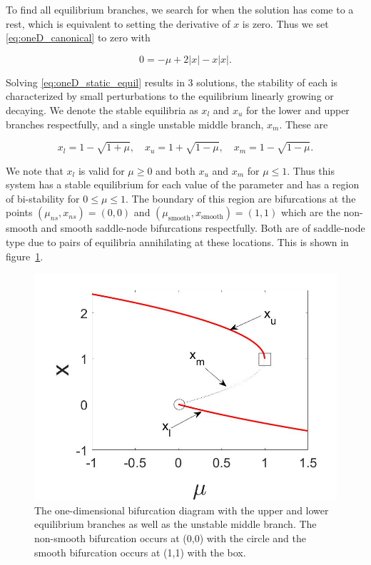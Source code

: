 To find all equilibrium branches, we search for when the solution has come to a rest, which is equivalent to setting the derivative of $x$ is zero. Thus we set \eqref{eq:oneD_canonical} to zero with

\begin{equation}\label{eq:oneD_static_equil}
0=-\mu +2|x|-x|x|.
\end{equation}

Solving \eqref{eq:oneD_static_equil} results in 3 solutions, the stability of each is characterized by small perturbations to the equilibrium linearly growing or decaying. We denote the stable equilibria as $x_l$ and $x_u$ for the lower and upper branches respectfully, and a single unstable middle branch, $x_{m}$. These are

\begin{equation*}
x_l=1-\sqrt{1+\mu},\quad x_u=1+\sqrt{1-\mu},\quad
x_{m}=1-\sqrt{1-\mu}.
\end{equation*}

We note that $x_l$ is valid for $\mu\ge 0$ and both $x_u$ and $x_{m}$ for $\mu\le 1$. Thus this system has a stable equilibrium for each value of the parameter and has a region of bi-stability for $0\le \mu\le 1$. The boundary of this region are bifurcations at the points ${(\mu_{ns},x_{ns})=(0,0)}$ and $(\mu_{\text{smooth}},x_{\text{smooth}})=(1,1)$ which are the non-smooth and smooth saddle-node bifurcations respectfully. Both are of saddle-node type due to pairs of equilibria annihilating at these locations. This is shown in figure~\ref{fig:oneD_static_bifdiagram}.

\begin{figure}[H]
\centering
\includegraphics[width=.8\textwidth]{oneD/bif_diagram.jpg}
\caption{The one-dimensional bifurcation diagram with the upper and lower equilibrium branches as well as the unstable middle branch. The non-smooth bifurcation occurs at (0,0) with the circle and the smooth bifurcation occurs at (1,1) with the box. }
\label{fig:oneD_static_bifdiagram}
\end{figure}


